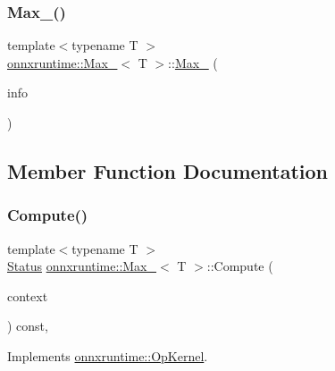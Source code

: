 \subsubsection{\texorpdfstring{Max\+\_()}{Max\_6()}}
{\footnotesize\ttfamily template$<$typename T $>$ \\
\mbox{\hyperlink{classonnxruntime_1_1Max__6}{onnxruntime\+::\+Max\+\_}}$<$ T $>$\+::\mbox{\hyperlink{classonnxruntime_1_1Max__6}{Max\+\_}} (\begin{DoxyParamCaption}\item[{const \mbox{\hyperlink{classonnxruntime_1_1OpKernelInfo}{Op\+Kernel\+Info}} \&}]{info }\end{DoxyParamCaption})\hspace{0.3cm}{\ttfamily [inline]}}



\subsection{Member Function Documentation}
\mbox{\label{classonnxruntime_1_1Max__6_a40f9a47a49395a3add4fea12385f448c}} 
\subsubsection{\texorpdfstring{Compute()}{Compute()}\hspace{0.1cm}{\footnotesize\ttfamily [1/2]}}
{\footnotesize\ttfamily template$<$typename T $>$ \\
\mbox{\hyperlink{classonnxruntime_1_1common_1_1Status}{Status}} \mbox{\hyperlink{classonnxruntime_1_1Max__6}{onnxruntime\+::\+Max\+\_}}$<$ T $>$\+::Compute (\begin{DoxyParamCaption}\item[{\mbox{\hyperlink{classonnxruntime_1_1OpKernelContext}{Op\+Kernel\+Context}} $\ast$}]{context }\end{DoxyParamCaption}) const\hspace{0.3cm}{\ttfamily [override]}, {\ttfamily [virtual]}}



Implements \mbox{\hyperlink{classonnxruntime_1_1OpKernel_a9eca8656a78b1b3ab9d3351a12798650}{onnxruntime\+::\+Op\+Kernel}}.

\mbox{\label{classonnxruntime_1_1Max__6_a952abc27ee16328f3bfc831c3aa8e3db}} 
